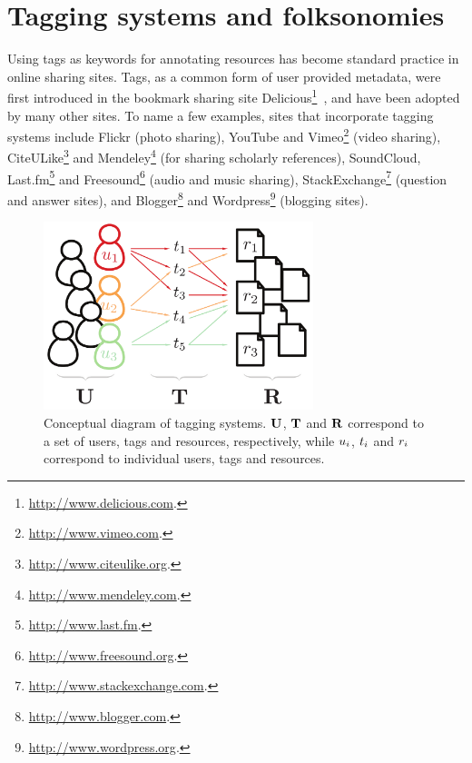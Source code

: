 

\section{Tagging systems and folksonomies}
\label{sec:intro_tagging_systems_and_folksonomies}


Using tags as keywords for annotating resources has become standard practice in online sharing sites.
Tags, as a common form of user provided metadata, were first introduced in the bookmark sharing site Delicious\footnote{\url{http://www.delicious.com}.}~\citep{Gupta2010, wikipedia_tag}, and have been adopted by many other sites. To name a few examples, sites that incorporate tagging systems include Flickr (photo sharing), YouTube and Vimeo\footnote{\url{http://www.vimeo.com}.} (video sharing), CiteULike\footnote{\url{http://www.citeulike.org}.} and Mendeley\footnote{\url{http://www.mendeley.com}.} (for sharing scholarly references), SoundCloud, Last.fm\footnote{\url{http://www.last.fm}.} and Freesound\footnote{\url{http://www.freesound.org}.} (audio and music sharing), StackExchange\footnote{\url{http://www.stackexchange.com}.} (question and answer sites), and Blogger\footnote{\url{http://www.blogger.com}.} and Wordpress\footnote{\url{http://www.wordpress.org}.} (blogging sites).

\begin{figure}[t]
  \centering
  \includegraphics[width=0.7\textwidth]{ch01_introduction/pics/tagging_diagram}
  \caption[Conceptual diagram of tagging systems]{Conceptual diagram of tagging systems. $\mathbf{U}$, $\mathbf{T}$ and $\mathbf{R}$ correspond to a set of users, tags and resources, respectively, while $u_i$, $t_i$ and $r_i$ correspond to individual users, tags and resources.}
  \label{fig:tagging_diagram}
\end{figure}

